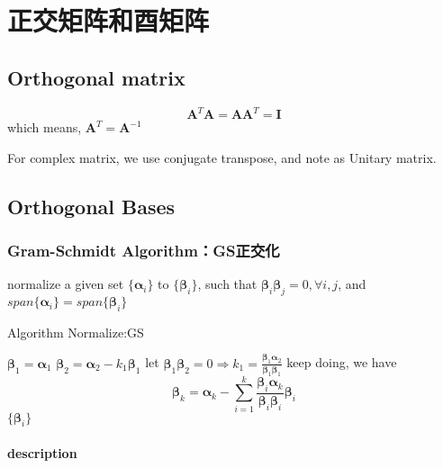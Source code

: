 \documentclass[UTF8]{../../09-Mathematics}
\begin{document}
\chapter{正交矩阵和酉矩阵}


\section{Orthogonal matrix}

$$
\boldsymbol{A}^T\boldsymbol{A} = \boldsymbol{A}\boldsymbol{A} ^T = \boldsymbol{I}
$$
which means, $\boldsymbol{A}^T = \boldsymbol{A} ^{-1}$

For complex matrix, we use conjugate transpose, and note as Unitary matrix.


\section{Orthogonal Bases}

\subsection{Gram-Schmidt Algorithm：GS正交化}



normalize a given set $\{ \boldsymbol \alpha_i\}$ to $\{\boldsymbol  \beta_i\}$, such that $\boldsymbol  \beta_i \boldsymbol  \beta_j = 0, \forall i,j$, and $span\{ \boldsymbol \alpha_i\} = span\{ \boldsymbol \beta_i\}$

\begin{algorithm}[H]
    \caption{Algorithm Normalize:GS}\label{algo:Normalize:GS}
    \SetAlgoLined
    $\boldsymbol \beta _1 = \boldsymbol \alpha _1$\;
    $\boldsymbol \beta _2 = \boldsymbol \alpha _2 - k_1 \boldsymbol  \beta _1$\;
    let $\boldsymbol \beta _1 \boldsymbol \beta _2 = 0 \Rightarrow k_1 = \frac{\boldsymbol \beta _1 \boldsymbol \alpha _2}{ \boldsymbol \beta _1 \boldsymbol \beta _1}$\;
    keep doing, we have
    $$\boldsymbol  \beta _k = \boldsymbol \alpha _k-\sum_{i=1}^{k}\frac{\boldsymbol \beta _i \boldsymbol \alpha _k}{\boldsymbol \beta _i \boldsymbol \beta _i} \boldsymbol \beta _i$$
    \KwRet $\{\boldsymbol  \beta_i\}$\;
\end{algorithm}








\subsubsection{description}
\end{document}
